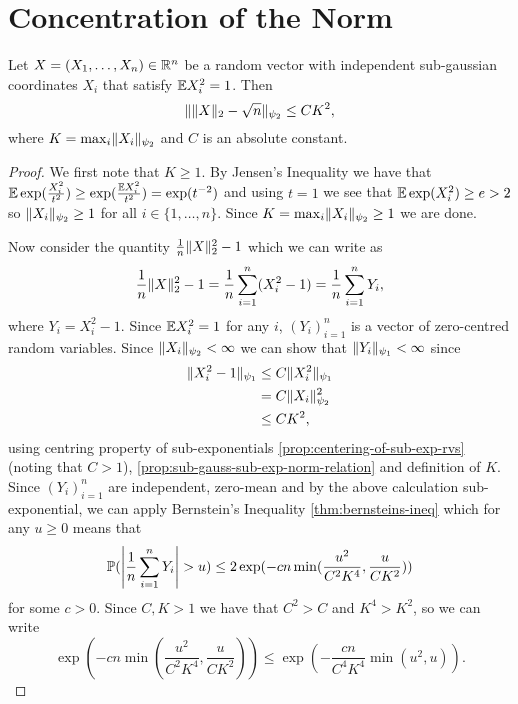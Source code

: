 \documentclass{article}
\begin{document}
\section{Concentration of the Norm}
\begin{theorem}
Let \(X = (X_{1}, \dots, X_{n}) \in \R^{n}\) be a random vector with independent
sub-gaussian coordinates \(X_{i}\) that satisfy \(\E X_{i}^{2} = 1\). Then
\begin{equation}
  \norm{\norm{X}_{2} - \sqrt{n}}_{\psi_{2}} \leq CK^{2},
\end{equation}
where \(K = \max_{i} \norm{X_{i}}_{\psi_{2}}\) and \(C\) is an absolute constant.
\end{theorem}

\begin{proof}
  We first note that \(K \geq 1\). By Jensen's Inequality we have that
  \(\E \exp(\frac{X_{i}^{2}}{t^{2}}) \geq \exp(\frac{\E X_{i}^{2}}{t^{2}}) = \exp(t^{-2})\)
  and using \(t = 1\) we see that \(\E \exp(X_{i}^{2}) \geq e > 2\) so
  \(\norm{X_{i}}_{\psi_{2}} \geq 1\) for all \(i \in \{1, \dots, n\}\). Since
  \(K = \max_{i}\norm{X_{i}}_{\psi_{2}} \geq 1\) we are done.

  Now consider the quantity \(\frac{1}{n}\norm{X}_{2}^{2} - 1\) which we can write as
  \begin{equation}
    \frac{1}{n}\norm{X}_{2}^{2} - 1 = \frac{1}{n}\sum_{i=1}^{n}(X_{i}^{2} - 1) = \frac{1}{n}\sum_{i=1}^{n}Y_{i},
  \end{equation}
  where \(Y_{i} = X_{i}^{2} - 1\). Since \(\E X_{i}^{2} = 1\) for any \(i\),
  \((Y_{i})_{i=1}^{n}\) is a vector of zero-centred random variables. Since
  \(\norm{X_{i}}_{\psi_{2}} < \infty\) we can show that
  \(\norm{Y_{i}}_{\psi_{1}} < \infty\) since
  \begin{align}
    \label{al:1}
    \norm{X_i^2 - 1}_{\psi_1} & \leq C\norm{X_i^2}_{\psi_1} \\
                              & = C\norm{X_i}_{\psi_2}^2 \\
                              & \leq C K^2,
  \end{align}
  using centring property of sub-exponentials
  \cref{prop:centering-of-sub-exp-rvs} (noting that \(C > 1\)),
  \cref{prop:sub-gauss-sub-exp-norm-relation} and definition of \(K\). Since
  \((Y_{i})_{i=1}^{n}\) are independent, zero-mean and by the above calculation sub-exponential, we can apply Bernstein's Inequality
  \cref{thm:bernsteins-ineq} which for any \(u \geq 0\) means that
  \begin{equation}
    \Pr(\abs*{\frac{1}{n}\sum_{i=1}^{n}Y_{i}} > u) \leq 2 \exp(-cn\min(\frac{u^{2}}{C^{2}K^{4}}, \frac{u}{CK^{2}}))
  \end{equation}
  for some \(c > 0\). Since \(C, K > 1\) we have that \(C^{2} > C\) and
  \(K^{4} > K^{2}\), so we can write
  \begin{equation}
    \label{eq:conc-norm-bernstein}
    \exp(-cn\min(\frac{u^{2}}{C^{2}K^{4}}, \frac{u}{CK^{2}})) \leq \exp(-\frac{cn}{C^{4}K^{4}}\min(u^{2}, u)).
  \end{equation}


\end{proof}
\end{document}
